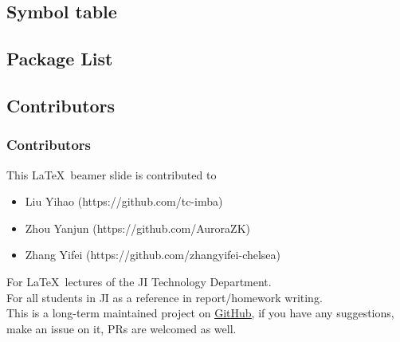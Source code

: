 \documentclass{beamer}
\begin{document}
\subsection{Symbol table}

\begin{frame}

\end{frame}

\subsection{Package List}

\begin{frame}

\end{frame}

\subsection{Contributors}

\begin{frame}
	\frametitle{Contributors}
	This \LaTeX\ beamer slide is contributed to
	\begin{itemize}
	\item Liu Yihao (https://github.com/tc-imba)\\
	\item Zhou Yanjun (https://github.com/AuroraZK)\\
	\item Zhang Yifei (https://github.com/zhangyifei-chelsea)
	\end{itemize}	
	For \LaTeX\ lectures of the JI Technology Department.\\
	For all students in JI as a reference in report/homework writing.\\[0.5em]
	
	This is a long-term maintained project on \href{https://github.com/SJTU-UMJI-Tech/LaTeX}{\color{blue}\underline{GitHub}}, if you have any suggestions, make an issue on it, PRs are welcomed as well.
	
\end{frame}
\end{document}
